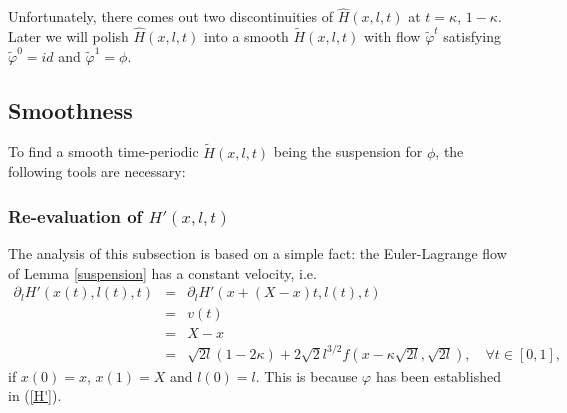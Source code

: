 \documentclass{amsart}
\begin{document}
Unfortunately, there comes out two discontinuities of $\hat{H}(x,l,t)$ at $t=\kappa$, $1-\kappa$. Later we will polish $\hat{H}(x,l,t)$ into a smooth $\tilde{H}(x,l,t)$ with flow $\tilde{\varphi}^t$ satisfying $\tilde{\varphi}^0=id$ and $\tilde{\varphi}^1=\phi$.
\subsection{Smoothness}
To find a smooth time-periodic $\tilde{H}(x,l,t)$ being the suspension for $\phi$, the following tools are necessary:
\subsubsection{Re-evaluation of $H'(x,l,t)$}
The analysis of this subsection is based on a simple fact: the Euler-Lagrange flow of Lemma \ref{suspension} has a constant velocity, i.e.
\begin{eqnarray}\label{speed}
\partial_lH'(x(t),l(t),t)&=&\partial_lH'(x+(X-x)t,l(t),t)\nonumber\\
&=&v(t)\nonumber\\
&=&X-x\nonumber\\
&=&\sqrt{2l}(1-2\kappa)+2\sqrt{2}l^{3/2}f(x-\kappa\sqrt{2l},\sqrt{2l}),\quad\forall t\in[0,1],
\end{eqnarray}
if $x(0)=x$, $x(1)=X$ and $l(0)=l$. This is because $\varphi$ has been established in (\ref{H'}). \\
\end{document}

